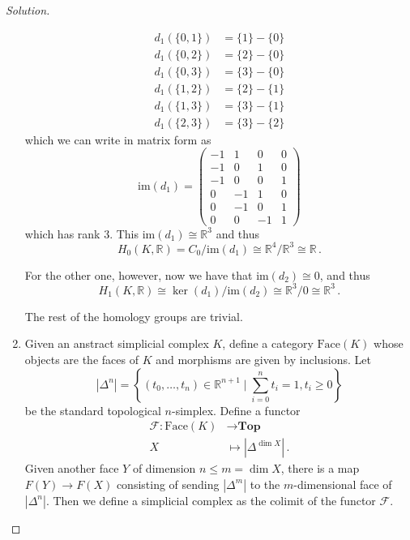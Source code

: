 \documentclass[a4paper,12pt]{article}
\newcommand{\fcal}{\mathcal{F}}
\newenvironment{solution}
  {\renewcommand\qedsymbol{$\blacksquare$}\begin{proof}[Solution]}
  {\end{proof}}
\theoremstyle{definition}
\begin{document}
\begin{solution}
\begin{enumerate}[label = \alph*)]
    \begin{align*}
        d_1(\{0,1\}) &= \{1\}-\{0\}\\
        d_1(\{0,2\}) & =\{2\} -\{0\}\\
        d_1(\{0,3\}) & = \{3\} - \{0\}\\
        d_1(\{1,2\}) & = \{2\} - \{1\}\\
        d_1(\{1,3\}) & = \{3\}-\{1\}\\
        d_1(\{2,3\}) & = \{3\} - \{2\}
    \end{align*}
    which we can write in matrix form as 
    $$\mathrm{im}(d_1) = 
    \begin{pmatrix}
    -1 & 1 & 0 & 0\\
    -1 & 0 & 1 & 0\\
    -1 & 0 & 0 & 1\\
    0 & -1 & 1 & 0\\
    0 & -1 & 0 & 1\\
    0 & 0 & -1 & 1
    \end{pmatrix}$$
    which has rank 3. This $\mathrm{im}(d_1) \cong \mathbb{R}^3$ and thus 
    $$H_0(K, \mathbb{R}) = C_0/\mathrm{im}(d_1) \cong \mathbb{R}^4/\mathbb{R}^3 \cong \mathbb{R} \, .$$
    
    For the other one, however, now we have that $\mathrm{im}(d_2) \cong 0$, and thus 
    $$H_1(K, \mathbb{R}) \cong \ker(d_1)/\mathrm{im}(d_2) \cong \mathbb{R}^3/0 \cong \mathbb{R}^3 \, .$$
    
    The rest of the homology groups are trivial. 
    \item Given an anstract simplicial complex $K$, define a category $\text{Face}(K)$ whose objects are the faces of $K$ and morphisms are given by inclusions. Let 
    $$|\Delta^n| = \left\{ (t_0, \dots, t_n) \in \mathbb{R}^{n+1} \mid \sum_{i=0}^n t_i = 1, t_i \geq 0 \right\}$$
    be the standard topological $n$-simplex. Define a functor 
    \begin{align*}
        \fcal \colon \text{Face}(K) & \to \textbf{Top}\\
        X & \mapsto |\Delta^{\dim X}| \, .
    \end{align*}
    Given another face $Y$ of dimension $n \leq m = \dim X$, there is a map $F(Y) \to F(X)$ consisting of sending $|\Delta^m|$ to the $m$-dimensional face of $|\Delta^n|$. Then we define a simplicial complex as the colimit of the functor $\fcal$. 
\end{enumerate}
\end{solution}
\end{document}
